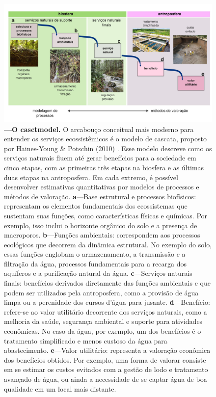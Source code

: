 \documentclass[./main.tex]{subfiles}
\begin{document}
\begin{figure}[t!] 
\centering				
\includegraphics[width=0.98\linewidth]{figs/fig_cascade.jpg}		
\caption[O \gls{model} de cascata de serviços naturais]
{\textbf{---\;O \gls{casctmodel}.}
    O arcabouço conceitual mais moderno para entender os serviços ecossistêmicos é o modelo de cascata, proposto por Haines-Young \& Potschin (2010) \cite{haines-young2010}. Esse modelo descreve como os serviços naturais fluem até gerar benefícios para a sociedade em cinco etapas, com as primeiras três etapas na biosfera e as últimas duas etapas na antroposfera. Em cada extremo, é possível desenvolver estimativas quantitativas por modelos de processos e métodos de valoração.
    \;\textbf{a}\;---\;Base estrutural e processos biofísicos: representam os elementos fundamentais dos ecossistemas que sustentam suas funções, como características físicas e químicas. Por exemplo, isso inclui o horizonte orgânico do solo e a presença de macroporos.
    \;\textbf{b}\;---\;Funções ambientais: correspondem aos processos ecológicos que decorrem da dinâmica estrutural. No exemplo do solo, essas funções englobam o armazenamento, a transmissão e a filtração da água, processos fundamentais para a recarga dos aquíferos e a purificação natural da água.
    \;\textbf{c}\;---\;Serviços naturais finais: benefícios derivados diretamente das funções ambientais e que podem ser utilizados pela antroposfera, como a provisão de água limpa ou a perenidade dos cursos d'água para jusante.
    \;\textbf{d}\;---\;Benefício: refere-se ao valor utilitário decorrente dos serviços naturais, como a melhoria da saúde, segurança ambiental e suporte para atividades econômicas. No caso da água, por exemplo, um dos benefícios é o tratamento simplificado e menos custoso da água para abastecimento.
    \;\textbf{e}\;---\;Valor utilitário: representa a valoração econômica dos benefícios obtidos. Por exemplo, uma forma de valorar consiste em se estimar os custos evitados com a gestão de lodo e tratamento avançado de água, ou ainda a necessidade de se captar água de boa qualidade em um local mais distante.
}
\label{fig:eco:cascade} 		
\end{figure}
\end{document}
